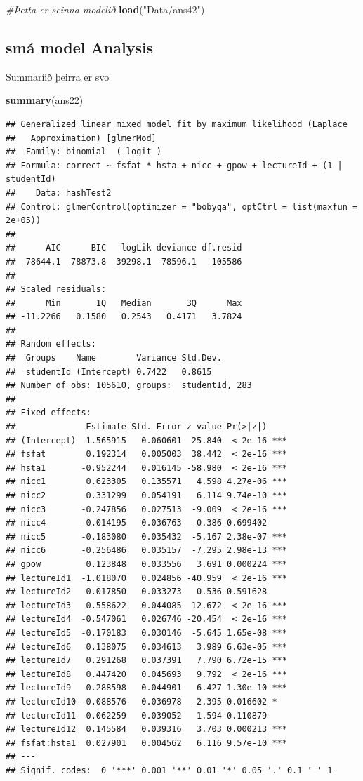 \documentclass[
]{article}
\newenvironment{Shaded}{\begin{snugshade}}{\end{snugshade}}
\newcommand{\CommentTok}[1]{\textcolor[rgb]{0.56,0.35,0.01}{\textit{#1}}}
\newcommand{\KeywordTok}[1]{\textcolor[rgb]{0.13,0.29,0.53}{\textbf{#1}}}
\newcommand{\NormalTok}[1]{#1}
\newcommand{\StringTok}[1]{\textcolor[rgb]{0.31,0.60,0.02}{#1}}
\begin{document}
\begin{Shaded}
\begin{Highlighting}[]
\CommentTok{#Þetta er seinna modelið}
\KeywordTok{load}\NormalTok{(}\StringTok{"Data/ans42"}\NormalTok{)}
\end{Highlighting}
\end{Shaded}

\hypertarget{smuxe1-model-analysis}{%
\subsection{smá model Analysis}\label{smuxe1-model-analysis}}

Summaríið þeirra er svo

\begin{Shaded}
\begin{Highlighting}[]
\KeywordTok{summary}\NormalTok{(ans22)}
\end{Highlighting}
\end{Shaded}

\begin{verbatim}
## Generalized linear mixed model fit by maximum likelihood (Laplace
##   Approximation) [glmerMod]
##  Family: binomial  ( logit )
## Formula: correct ~ fsfat * hsta + nicc + gpow + lectureId + (1 | studentId)
##    Data: hashTest2
## Control: glmerControl(optimizer = "bobyqa", optCtrl = list(maxfun = 2e+05))
## 
##      AIC      BIC   logLik deviance df.resid 
##  78644.1  78873.8 -39298.1  78596.1   105586 
## 
## Scaled residuals: 
##      Min       1Q   Median       3Q      Max 
## -11.2266   0.1580   0.2543   0.4171   3.7824 
## 
## Random effects:
##  Groups    Name        Variance Std.Dev.
##  studentId (Intercept) 0.7422   0.8615  
## Number of obs: 105610, groups:  studentId, 283
## 
## Fixed effects:
##              Estimate Std. Error z value Pr(>|z|)    
## (Intercept)  1.565915   0.060601  25.840  < 2e-16 ***
## fsfat        0.192314   0.005003  38.442  < 2e-16 ***
## hsta1       -0.952244   0.016145 -58.980  < 2e-16 ***
## nicc1        0.623305   0.135571   4.598 4.27e-06 ***
## nicc2        0.331299   0.054191   6.114 9.74e-10 ***
## nicc3       -0.247856   0.027513  -9.009  < 2e-16 ***
## nicc4       -0.014195   0.036763  -0.386 0.699402    
## nicc5       -0.183080   0.035432  -5.167 2.38e-07 ***
## nicc6       -0.256486   0.035157  -7.295 2.98e-13 ***
## gpow         0.123848   0.033556   3.691 0.000224 ***
## lectureId1  -1.018070   0.024856 -40.959  < 2e-16 ***
## lectureId2   0.017850   0.033273   0.536 0.591628    
## lectureId3   0.558622   0.044085  12.672  < 2e-16 ***
## lectureId4  -0.547061   0.026746 -20.454  < 2e-16 ***
## lectureId5  -0.170183   0.030146  -5.645 1.65e-08 ***
## lectureId6   0.138075   0.034613   3.989 6.63e-05 ***
## lectureId7   0.291268   0.037391   7.790 6.72e-15 ***
## lectureId8   0.447420   0.045693   9.792  < 2e-16 ***
## lectureId9   0.288598   0.044901   6.427 1.30e-10 ***
## lectureId10 -0.088576   0.036978  -2.395 0.016602 *  
## lectureId11  0.062259   0.039052   1.594 0.110879    
## lectureId12  0.145584   0.039316   3.703 0.000213 ***
## fsfat:hsta1  0.027901   0.004562   6.116 9.57e-10 ***
## ---
## Signif. codes:  0 '***' 0.001 '**' 0.01 '*' 0.05 '.' 0.1 ' ' 1
\end{verbatim}
\end{document}
